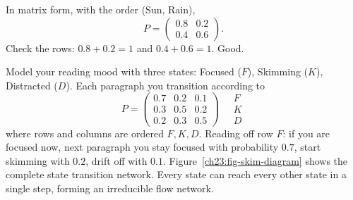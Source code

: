 In matrix form, with the order (Sun, Rain),
\[
  P = \begin{pmatrix} 0.8 & 0.2 \\ 0.4 & 0.6 \end{pmatrix}.
\]
Check the rows: $0.8 + 0.2 = 1$ and $0.4 + 0.6 = 1$. Good.

\begin{example}
\label{ch23:ex-skim}
Model your reading mood with three states: Focused ($F$), Skimming ($K$), Distracted ($D$).
Each paragraph you transition according to
\[
  P = \begin{pmatrix}
   0.7 & 0.2 & 0.1 \\
   0.3 & 0.5 & 0.2 \\
   0.2 & 0.3 & 0.5
  \end{pmatrix}
  \quad
  \begin{array}{l} F \\ K \\ D \end{array}
\]
where rows and columns are ordered $F, K, D$. Reading off row $F$: if you are focused now,
next paragraph you stay focused with probability $0.7$, start skimming with $0.2$, drift off
with $0.1$. Figure~\ref{ch23:fig-skim-diagram} shows the complete state transition network.
Every state can reach every other state in a single step, forming an irreducible flow network.
\end{example}

